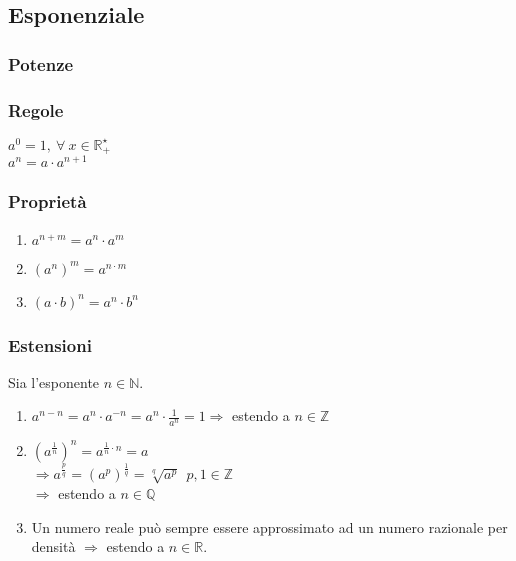 \subsection{Esponenziale}
\subsubsection{Potenze}
    \subsubsection*{Regole}
        \begin{Large}
            $a^{0} = 1,\ \forall\ x \in \mathbb{R}^{\star}_{+}$\\
            $a^{n} = a \cdot a^{n+1}$
        \end{Large}
    \subsubsection*{Proprietà}
        \begin{large}
            \begin{enumerate}
                \item $a^{n+m} = a^{n} \cdot a^{m}$
                \item ${(a^{n})}^{m} = a^{n \cdot m}$
                \item ${(a \cdot b)}^{n} = a^{n} \cdot b^{n}$
            \end{enumerate}
        \end{large}
    \subsubsection*{Estensioni}
        Sia l'esponente $n \in \mathbb{N}$.
        \begin{large}
            \begin{enumerate}
                \item $a^{n-n} = a^{n} \cdot a^{-n} = a^{n} \cdot \frac{1}{a^{n}} = 1 \Rightarrow$ estendo a $n \in \mathbb{Z}$
                \item ${(a^{\frac{1}{n}})}^{n} = a^{\frac{1}{n} \cdot n} = a$\\
                    $\Rightarrow a^{\frac{p}{q}} = {(a^{p})}^{\frac{1}{q}} = \sqrt[{q}]{a^{p}}\ \ p,1 \in \mathbb{Z}$\\
                    $\Rightarrow$ estendo a $n \in \mathbb{Q}$
                \item Un numero reale può sempre essere approssimato ad un numero razionale per densità $\Rightarrow$ estendo a $n \in \mathbb{R}$.
            \end{enumerate}
        \end{large}
